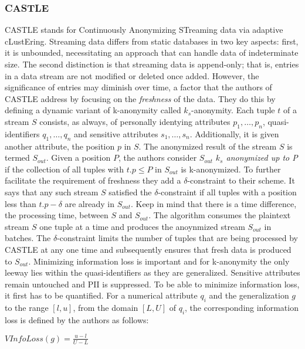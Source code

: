 \subsubsection{CASTLE\label{lit:castle}}
CASTLE stands for Continuously Anonymizing STreaming data via adaptive cLustEring. Streaming data differs from static databases in two key aspects: first, it is unbounded, necessitating an approach that can handle data of indeterminate size. The second distinction is that streaming data is append-only; that is, entries in a data stream are not modified or deleted once added. However, the significance of entries may diminish over time, a factor that the authors of CASTLE address by focusing on the \textit{freshness} of the data. They do this by defining a dynamic variant of k-anonymity called $k_s$-anonymity. Each tuple $t$ of a stream $S$ consists, as always, of personally identying attributes $p_1, \dots, p_n$, quasi-identifiers $q_1, \dots, q_n$ and sensitive attributes $s_1,\dots, s_n$. Additionally, it is given another attribute, the position $p$ in $S$. The anonymized result of the stream $S$ is termed $S_{out}$. Given a position $P$, the authors consider $S_{out}$ \textit{$k_s$ anonymized up to P} if the collection of all tuples with $t.p \le P$ in $S_{out}$ is k-anonymized. To further facilitate the requirement of freshness they add a $\delta$-constraint to their scheme. It says that any such stream $S$ satisfied the $\delta$-constraint if all tuples with a position less than $t.p - \delta$ are already in $S_{out}$. Keep in mind that there is a time difference, the processing time, between $S$ and $S_{out}$. The algorithm consumes the plaintext stream $S$ one tuple at a time and produces the anoynmized stream $S_{out}$ in  batches. The $\delta$-constraint limits the number of tuples that are being processed by CASTLE at any one time and subsequently ensures that fresh data is produced to $S_{out}$. \newline
\indent Minimizing information loss is important and for k-anonymity the only leeway lies within the quasi-identifiers as they are generalized. Sensitive attributes remain untouched and \ac{PII} is suppressed. To be able to minimize information loss, it first has to be quantified. For a numerical attribute $q_i$ and the generalization $g$ to the range $[l,u]$, from the domain $[L,U]$ of $q_i$, the corresponding information loss is defined by the authors as follows: 

\begin{center}
    $VInfoLoss(g) = \frac{u - l}{U - L}$
\end{center}

